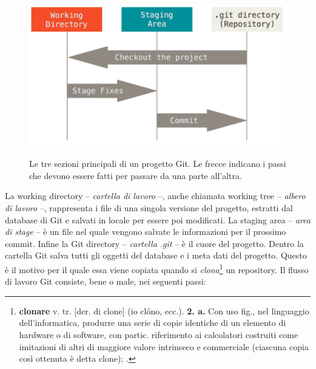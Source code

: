 \documentclass[./main.tex]{subfiles}
\begin{document}
\begin{figure}[!ht]
\noindent\begin{minipage}{0.5\textwidth}
\vspace{1cm}
\includegraphics[width=\textwidth]{images/git_states.pdf}
\captionsetup{font=small, hypcap=false}
\label{fig:git_states}
\end{minipage}
\hspace{0.05\textwidth}
\begin{minipage}{0.4\textwidth}
\begin{small}
Le tre sezioni principali di un progetto Git. Le frecce indicano i passi che devono essere fatti per passare da una parte all'altra.
\end{small}
\end{minipage}
\vspace{0.25cm}
\end{figure}

La working directory -- \textit{cartella di lavoro} --, anche chiamata working tree -- \textit{albero di lavoro} --, rappresenta i file di una singola versione del progetto, estratti dal database di Git e salvati in locale per essere poi modificati. La staging area -- \textit{area di stage} -- è un file nel quale vengono salvate le informazioni per il prossimo commit. Infine la Git directory -- \textit{cartella .git} -- è il cuore del progetto. Dentro la cartella Git salva tutti gli oggetti del database e i meta dati del progetto. Questo è il motivo per il quale essa viene copiata quando si \textit{clona}\footnote{\textbf{clonare} v. tr. [der. di clone] (io clóno, ecc.). \textbf{2. a.} Con uso fig., nel linguaggio dell’informatica, produrre una serie di copie identiche di un elemento di hardware o di software, con partic. riferimento ai calcolatori costruiti come imitazioni di altri di maggiore valore intrinseco e commerciale (ciascuna copia così ottenuta è detta clone); \cite{treccani-clonare}.} un repository. Il flusso di lavoro Git consiste, bene o male, nei seguenti passi:
\end{document}
